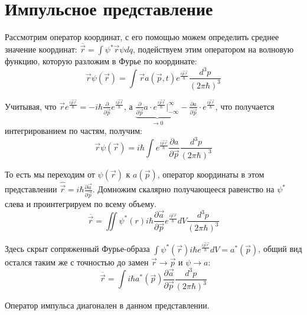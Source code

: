 \newpage
\chapter{Импульсное представление}
\par Рассмотрим оператор координат, с его помощью можем определить среднее значение координат: $\overline{\vec{r}} = \int \psi^* \vec{r} \psi dq$, подействуем этим оператором на волновую функцию, которую разложим в Фурье по координате:
$$ \vec{r} \psi (\vec{r}) = \int \vec{r} a(\vec{p} {,} t) e^{\frac{i \vec{p} \vec{r}}{\hbar}} \frac{d^3p}{(2 \pi \hbar)^3} $$
\par Учитывая, что $\vec{r}  e^{\frac{i \vec{p} \vec{r}}{\hbar}} = -i \hbar \frac{\partial }{\partial \vec{p}}  e^{\frac{i \vec{p} \vec{r}}{\hbar}} $, а $\underbrace{\frac{\partial }{\partial \vec{p}} a \cdot  e^{\frac{i \vec{p} \vec{r}}{\hbar}} \bigg|_{- \infty}^{\infty}}_{\rightarrow 0} - \frac{\partial a }{\partial \vec{p}} \cdot e^{\frac{i \vec{p} \vec{r}}{\hbar}}$, что получается интегрированием по частям, получим:
$$ \vec{r} \psi (\vec{r}) = i \hbar \int e^{\frac{i \vec{p} \vec{r}}{\hbar}} \frac{\partial a }{\partial \vec{p}} \frac{d^3p}{(2 \pi \hbar)^3} $$
\par То есть мы переходим от $\psi(\vec{r})$ к $a(\vec{p})$, оператор координаты в этом представлении $\hat{\vec{r}} = i \hbar \frac{\partial \vec{a} }{\partial \vec{p}} $. Домножим скалярно получающееся равенство на $\psi^*$ слева и проинтегрируем по всему объему.
$$ \overline{\vec{r}} = \iint \psi^* (r) i \hbar \frac{\partial \vec{a} }{\partial \vec{p}} e^{\frac{i \vec{p} \vec{r}}{\hbar}} dV \frac{d^3p}{(2 \pi \hbar)^3}$$
\par Здесь скрыт сопряженный Фурье-образа $\int \psi^* (\vec{r}) i \hbar e^{\frac{i \vec{p} \vec{r}}{\hbar}} dV = a^*(\vec{p})$, общий вид остался таким же с точностью до замен $\vec{r} \rightarrow \vec{p}$ и $\psi \rightarrow a$:
$$  \overline{\vec{r}} =\int i \hbar a^*(\vec{p})  \frac{\partial \vec{a} }{\partial \vec{p}} \frac{d^3p}{(2 \pi \hbar)^3} $$
\par Оператор импульса диагонален в данном представлении.